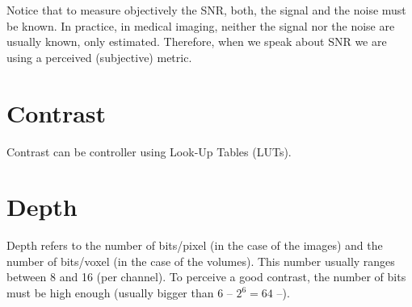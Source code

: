 Notice that to measure objectively the SNR, both, the signal and the
noise must be known. In practice, in medical imaging, neither the
signal nor the noise are usually known, only estimated. Therefore,
when we speak about SNR we are using a perceived (subjective) metric.

\section{Contrast}

Contrast can be controller using Look-Up Tables (LUTs).

\section{Depth}

Depth refers to the number of bits/pixel (in the case of the images)
and the number of bits/voxel (in the case of the volumes). This number
usually ranges between 8 and 16 (per channel). To perceive a good
contrast, the number of bits must be high enough (usually bigger than
6 -- $2^6=64$ --).
